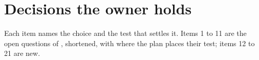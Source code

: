 
\section{Decisions the owner holds}
\label{sec:decisions}

Each item names the choice and the test that settles it. Items 1 to 11 are the open questions
of , shortened, with where the plan places their test; items 12 to 21 are new.

